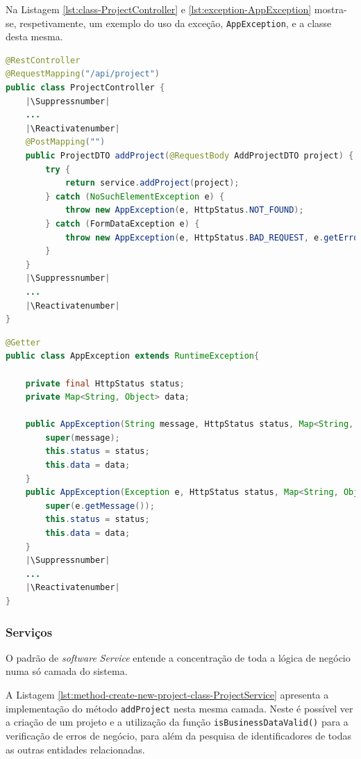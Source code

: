 Na Listagem \ref{lst:class-ProjectController} e \ref{lst:exception-AppException} mostra-se, respetivamente, um exemplo do uso da exceção, \lstinline|AppException|, e a classe desta mesma.

\begin{lstlisting}[language=Java, caption={Class \textit{ProjectController}}, label={lst:class-ProjectController}]
@RestController
@RequestMapping("/api/project")
public class ProjectController {
    |\Suppressnumber|
    ... 
    |\Reactivatenumber|
    @PostMapping("")
    public ProjectDTO addProject(@RequestBody AddProjectDTO project) {
        try {
            return service.addProject(project);
        } catch (NoSuchElementException e) {
            throw new AppException(e, HttpStatus.NOT_FOUND);
        } catch (FormDataException e) {
            throw new AppException(e, HttpStatus.BAD_REQUEST, e.getErrors());
        }
    }
    |\Suppressnumber|
    ... 
    |\Reactivatenumber|
}
\end{lstlisting}

\begin{lstlisting}[language=Java, caption={Exceção \textit{AppException}}, label={lst:exception-AppException}]
@Getter
public class AppException extends RuntimeException{

    private final HttpStatus status;
    private Map<String, Object> data;

    public AppException(String message, HttpStatus status, Map<String, Object> data) {
        super(message);
        this.status = status;
        this.data = data;
    }
    public AppException(Exception e, HttpStatus status, Map<String, Object> data) {
        super(e.getMessage());
        this.status = status;
        this.data = data;
    }
    |\Suppressnumber|
    ... 
    |\Reactivatenumber|
}
\end{lstlisting}







\subsubsection{Serviços}

O padrão de \textit{software} \textit{Service} entende a concentração de toda a lógica de negócio numa só camada do sistema. 

A Listagem \ref{lst:method-create-new-project-class-ProjectService} apresenta a implementação do método \lstinline|addProject| nesta mesma camada. Neste é possível ver a criação de um projeto e a utilização da função \lstinline|isBusinessDataValid()| para a verificação de erros de negócio, para além da pesquisa de identificadores de todas as outras entidades relacionadas.

